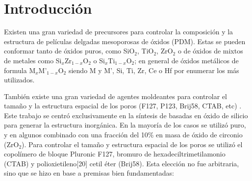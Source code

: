 \section{Introducción}

	Existen una gran variedad de precursores para controlar la composición y la estructura de películas delgadas mesoporosas de óxidos (PDM). Estas se pueden conformar tanto de óxidos puros, como SiO$_2$, TiO$_2$, ZrO$_2$ o de óxidos de mixtos de metales como Si$_x$Zr$_{1-x}$O$_2$ o Si$_x$Ti$_{1-x}$O$_2$; en general de óxidos metálicos de formula M$_{x}$M'$_{1-x}$O$_2$ siendo M y M', Si, Ti, Zr, Ce o Hf por enumerar los más utilizados.

	También existe una gran variedad de agentes moldeantes para controlar el tamaño y la estructura espacial de los poros (F127, P123, Brij58, CTAB, etc) \cite{angelome2011,schuth2013,Soler-Illia2006,Soler-Illia2002a}. Este trabajo se centró exclusivamente en la síntesis de \pdm\space basadas en óxido de silicio para generar la estructura inorgánica. En la mayoría de los casos se utilizó puro, y en algunos combinado con una fracción del 10\% en masa de óxido de circonio (ZrO$_2$). Para controlar el tamaño y estructura espacial de los poros se utilizó el copolímero de bloque Pluronic F127, bromuro de hexadeciltrimetilamonio (CTAB) y polioxietileno[20] cetil éter (Brij58). Esta elección no fue arbitraria, sino que se hizo en base a premisas bien fundamentadas:
		
